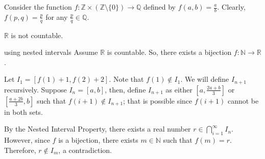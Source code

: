 \begin{dem}{}{}
	Consider the function \(f: \mathbb{Z} \times (\mathbb{Z} \setminus \{0\}) \to \mathbb{Q}\) defined by \(f(a, b) = \frac{a}{b}\). Clearly, \(f(p, q) = \frac{p}{q}\) for any \(\frac{p}{q} \in \mathbb{Q}\).
\end{dem}

\begin{prop}{}{}
	\(\mathbb{R}\) is not countable.
\end{prop}

\begin{dem}{using nested intervals}{}
	Assume \(\mathbb{R}\) is countable. So, there exists a bijection \(f: \mathbb{N} \to \mathbb{R}\).

	Let \(I_1 = [f(1) + 1, f(2) + 2]\). Note that \(f(1) \notin I_1\). We will define \(I_{n+1}\) recursively. 
	Suppose \(I_n = [a, b]\), then, define \(I_{n+1}\) as either \([a, \frac{2a + b}{3}]\) or \([\frac{a + 2b}{3}, b]\) such that \(f(i+1) \notin I_{n+1}\); that is possible since \(f(i+1)\) cannot be in both sets.

	By the Nested Interval Property, there exists a real number \(r \in \bigcap_{i=1}^\infty I_n\). However, since \(f \) is a bijection, there exists \(m \in \mathbb{N}\) such that \(f(m) = r\). Therefore, \(r \notin I_m\), a contradiction.
\end{dem}
